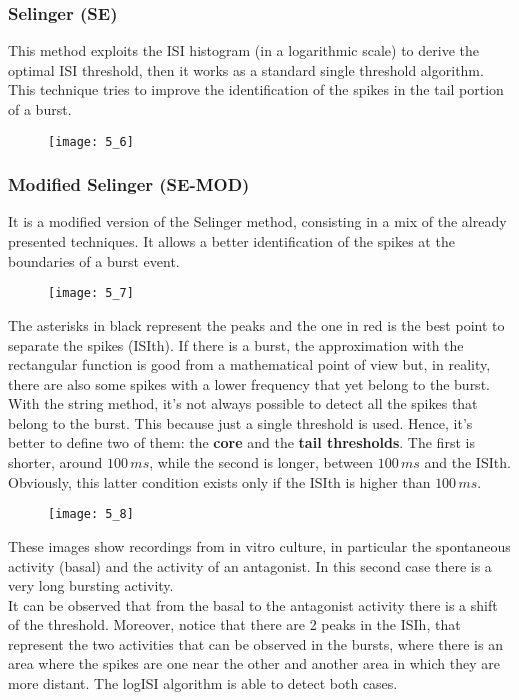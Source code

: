 \subsubsection{Selinger (SE)} 
This method exploits the ISI histogram (in a logarithmic scale) to derive the optimal ISI threshold, then it works as a standard single threshold algorithm. This technique tries to improve the identification of the spikes in the tail portion of a burst.
\begin{figure}[H]
    \texttt{[image: 5\_6]}
    \centering
\end{figure}

\subsubsection{Modified Selinger (SE-MOD)} 
It is a modified version of the Selinger method, consisting in a mix of the already presented techniques. It allows a better identification of the spikes at the boundaries of a burst event.
\begin{figure}[H]
    \texttt{[image: 5\_7]}
    \centering
\end{figure}
The asterisks in black represent the peaks and the one in red is the best point to separate the spikes (ISIth). If there is a burst, the approximation with the rectangular function is good from a mathematical point of view but, in reality, there are also some spikes with a lower frequency that yet belong to the burst.\\
With the string method, it's not always possible to detect all the spikes that belong to the burst. This because just a single threshold is used. Hence, it's better to define two of them: the \textbf{core} and the \textbf{tail thresholds}. The first is shorter, around \(100\,ms\), while the second is longer, between \(100\,ms\) and the ISIth. Obviously, this latter condition exists only if the ISIth is higher than \(100\,ms\). 
\begin{figure}[H]
    \texttt{[image: 5\_8]}
    \centering
\end{figure}
These images show recordings from in vitro culture, in particular the spontaneous activity (basal) and the activity
of an antagonist. In this second case there is a very long bursting activity.\\
It can be observed that from the basal to the antagonist activity there is a shift of the threshold. Moreover, notice that there are 2 peaks in the ISIh, that represent the two activities that can be observed in the bursts, where there is an area where the spikes are one near the other and another area in which they are more distant. The logISI algorithm is able to detect both cases. 


